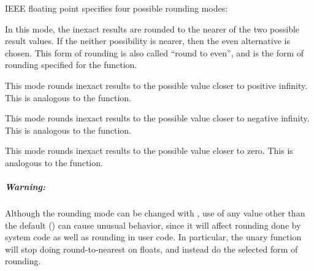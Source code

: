 IEEE floating point specifies four possible rounding modes:
\begin{Lentry}
  
\item[\kwd{nearest}] In this mode, the inexact results are rounded to
  the nearer of the two possible result values.  If the neither
  possibility is nearer, then the even alternative is chosen.  This
  form of rounding is also called ``round to even'', and is the form
  of rounding specified for the \clisp{}  function.
  
\item[\kwd{positive-infinity}] This mode rounds inexact results to the
  possible value closer to positive infinity.  This is analogous to
  the \clisp{}  function.
  
\item[\kwd{negative-infinity}] This mode rounds inexact results to the
  possible value closer to negative infinity.  This is analogous to
  the \clisp{}  function.
  
\item[\kwd{zero}] This mode rounds inexact results to the possible
  value closer to zero.  This is analogous to the \clisp{}
   function.
\end{Lentry}

\subparagraph{Warning:}

Although the rounding mode can be changed with
, use of any value other than the
default () can cause unusual behavior, since it will
affect rounding done by \llisp{} system code as well as rounding in
user code.  In particular, the unary  function will stop
doing round-to-nearest on floats, and instead do the selected form of
rounding.

